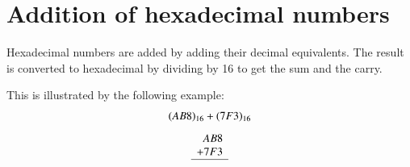 \section{Addition of hexadecimal numbers}\label{sec6.10}

Hexadecimal numbers are added by adding their decimal equivalents. The result is converted to hexadecimal by dividing by 16 to get the sum and the carry.

This is illustrated by the following example:
\begin{gather*}
(AB8)_{16}+(7F3)_{16}\\[4pt]
\begin{array}{r}
AB8\\
+7F3\\
\hline
\end{array}
\end{gather*}

